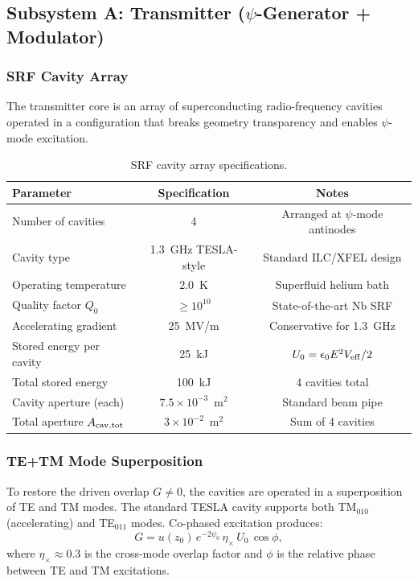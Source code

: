 \documentclass[11pt,onecolumn]{article}
\begin{document}
\subsection{Subsystem A: Transmitter ($\psi$-Generator + Modulator)}

\subsubsection{SRF Cavity Array}

The transmitter core is an array of superconducting radio-frequency
cavities operated in a configuration that breaks geometry transparency
and enables $\psi$-mode excitation.

\begin{table}[H]
\centering
\caption{SRF cavity array specifications.}
\label{tab:srf-specs}
\begin{tabular}{lcc}
\toprule
Parameter & Specification & Notes \\
\midrule
Number of cavities & 4 & Arranged at $\psi$-mode antinodes \\
Cavity type & 1.3~GHz TESLA-style & Standard ILC/XFEL design \\
Operating temperature & 2.0~K & Superfluid helium bath \\
Quality factor $Q_0$ & $\geq 10^{10}$ & State-of-the-art Nb SRF \\
Accelerating gradient & 25~MV/m & Conservative for 1.3~GHz \\
Stored energy per cavity & 25~kJ & $U_0 = \epsilon_0 E^2 V_{\rm eff}/2$ \\
Total stored energy & 100~kJ & 4 cavities total \\
Cavity aperture (each) & $7.5 \times 10^{-3}$~m$^2$ & Standard beam pipe \\
Total aperture $A_{\rm cav,tot}$ & $3 \times 10^{-2}$~m$^2$ & Sum of 4 cavities \\
\bottomrule
\end{tabular}
\end{table}

\subsubsection{TE+TM Mode Superposition}

To restore the driven overlap $G \neq 0$, the cavities are operated in
a superposition of TE and TM modes.
The standard TESLA cavity supports both TM$_{010}$ (accelerating) and
TE$_{011}$ modes.
Co-phased excitation produces:
\begin{equation}
G = u(z_0)\,e^{-2\psi_0}\,\eta_\times\,U_0\,\cos\phi,
\end{equation}
where $\eta_\times \approx 0.3$ is the cross-mode overlap factor and
$\phi$ is the relative phase between TE and TM excitations.
\end{document}
